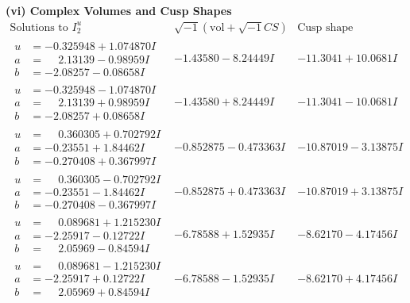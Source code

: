 \documentclass[1p]{elsarticle_modified}
\theoremstyle{definition}
\newcommand{\I}{\sqrt{-1}}
\begin{document}
\newpage\flushleft \textbf{(vi) Complex Volumes and Cusp Shapes}
$$\begin{array}{c|c|c}  
\text{Solutions to }I^u_{2}& \I (\text{vol} + \sqrt{-1}CS) & \text{Cusp shape}\\
 \hline 
\begin{aligned}
u &= -0.325948 + 1.074870 I \\
a &= \phantom{-}2.13139 - 0.98959 I \\
b &= -2.08257 - 0.08658 I\end{aligned}
 & -1.43580 - 8.24449 I & -11.3041 + 10.0681 I \\ \hline\begin{aligned}
u &= -0.325948 - 1.074870 I \\
a &= \phantom{-}2.13139 + 0.98959 I \\
b &= -2.08257 + 0.08658 I\end{aligned}
 & -1.43580 + 8.24449 I & -11.3041 - 10.0681 I \\ \hline\begin{aligned}
u &= \phantom{-}0.360305 + 0.702792 I \\
a &= -0.23551 + 1.84462 I \\
b &= -0.270408 + 0.367997 I\end{aligned}
 & -0.852875 - 0.473363 I & -10.87019 - 3.13875 I \\ \hline\begin{aligned}
u &= \phantom{-}0.360305 - 0.702792 I \\
a &= -0.23551 - 1.84462 I \\
b &= -0.270408 - 0.367997 I\end{aligned}
 & -0.852875 + 0.473363 I & -10.87019 + 3.13875 I \\ \hline\begin{aligned}
u &= \phantom{-}0.089681 + 1.215230 I \\
a &= -2.25917 - 0.12722 I \\
b &= \phantom{-}2.05969 - 0.84594 I\end{aligned}
 & -6.78588 + 1.52935 I & -8.62170 - 4.17456 I \\ \hline\begin{aligned}
u &= \phantom{-}0.089681 - 1.215230 I \\
a &= -2.25917 + 0.12722 I \\
b &= \phantom{-}2.05969 + 0.84594 I\end{aligned}
 & -6.78588 - 1.52935 I & -8.62170 + 4.17456 I \\ \hline\begin{aligned}

\end{aligned}
\end{array}$$
\end{document}
